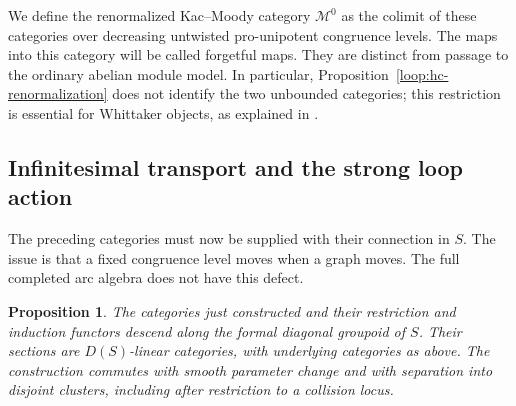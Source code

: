 \documentclass[11pt]{article}
\numberwithin{equation}{section}
\newtheorem{proposition}[theorem]{Proposition}
\theoremstyle{definition}
\theoremstyle{remark}
\begin{document}
We define the renormalized Kac--Moody category $\mathcal M^0$ as the
colimit of these categories over decreasing untwisted pro-unipotent
congruence levels.  The maps into this category will be called
forgetful maps.  They are distinct from passage to the ordinary
abelian module model.  In particular, Proposition~\ref{loop:hc-renormalization}
does not identify the two unbounded categories; this restriction is
essential for Whittaker objects, as explained in
\cite[Sections~1.5.7--1.5.9]{RaskinW}.

\subsection{Infinitesimal transport and the strong loop action}

The preceding categories must now be supplied with their connection
in $S$.  The issue is that a fixed congruence level moves when a graph
moves.  The full completed arc algebra does not have this defect.

\begin{proposition}\label{loop:crystal}
The categories just constructed and their restriction and induction
functors descend along the formal diagonal groupoid of $S$.
Their sections are $D(S)$-linear categories, with underlying categories
as above.  The construction commutes with smooth parameter change and
with separation into disjoint clusters, including after restriction
to a collision locus.
\end{proposition}
\end{document}
